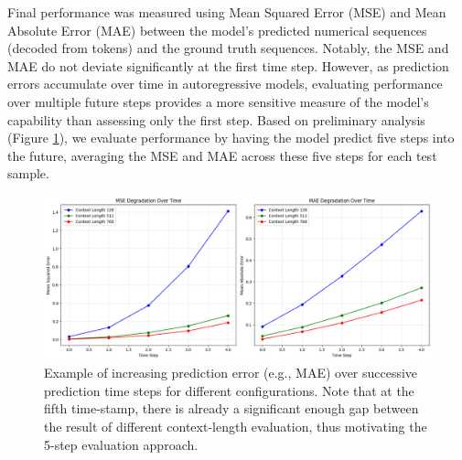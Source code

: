 \documentclass{article}
\begin{document}
Final performance was measured using Mean Squared Error (MSE) and Mean Absolute Error (MAE) between the model's predicted numerical sequences (decoded from tokens) and the ground truth sequences. Notably, the MSE and MAE do not deviate significantly at the first time step. However, as prediction errors accumulate over time in autoregressive models, evaluating performance over multiple future steps provides a more sensitive measure of the model’s capability than assessing only the first step. Based on preliminary analysis (Figure \ref{fig:metric-diff-between-timestamp}), we evaluate performance by having the model predict five steps into the future, averaging the MSE and MAE across these five steps for each test sample.



\begin{figure}[!htbp] %
    \centering
    \includegraphics[width=0.9\linewidth]{M2 Course Work//Images/metric_diff_between_timestamp.png} %
    \caption{Example of increasing prediction error (e.g., MAE) over successive prediction time steps for different configurations. Note that at the fifth time-stamp, there is already a significant enough gap between the result of different context-length evaluation, thus motivating the 5-step evaluation approach.} %
    \label{fig:metric-diff-between-timestamp}
\end{figure}
\end{document}
